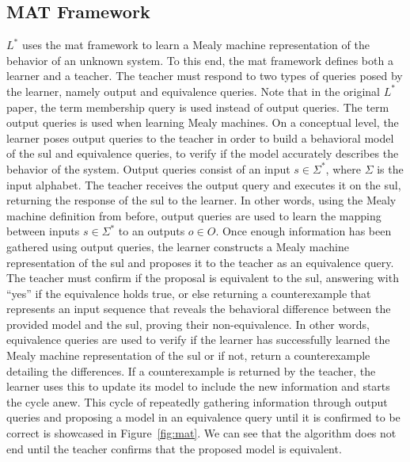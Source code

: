 \subsection{MAT Framework}

$L^*$ uses the \ac{mat} framework to learn a Mealy machine representation of the behavior of an unknown system. To this end, the \ac{mat} framework defines both a learner and a teacher. The teacher must respond to two types of queries posed by the learner, namely output and equivalence queries. Note that in the original $L^*$ paper, the term membership query is used instead of output queries. The term output queries is used when learning Mealy machines. On a conceptual level, the learner poses output queries to the teacher in order to build a behavioral model of the \ac{sul} and equivalence queries, to verify if the model accurately describes the behavior of the system. Output queries consist of an input $s \in \Sigma^*$, where $\Sigma$ is the input alphabet. The teacher receives the output query and executes it on the \ac{sul}, returning the response of the \ac{sul} to the learner. In other words, using the Mealy machine definition from before, output queries are used to learn the mapping between inputs $s \in \Sigma^*$ to an outputs $o \in O$. Once enough information has been gathered using output queries, the learner constructs a Mealy machine representation of the \ac{sul} and proposes it to the teacher as an equivalence query. The teacher must confirm if the proposal is equivalent to the \ac{sul}, answering with  ``yes'' if the equivalence holds true, or else returning a counterexample that represents an input sequence that reveals the behavioral difference between the provided model and the \ac{sul}, proving their non-equivalence. In other words, equivalence queries are used to verify if the learner has successfully learned the Mealy machine representation of the \ac{sul} or if not, return a counterexample detailing the differences. If a counterexample is returned by the teacher, the learner uses this to update its model to include the new information and starts the cycle anew. This cycle of repeatedly gathering information through output queries and proposing a model in an equivalence query until it is confirmed to be correct is showcased in Figure~\ref{fig:mat}. We can see that the algorithm does not end until the teacher confirms that the proposed model is equivalent.

